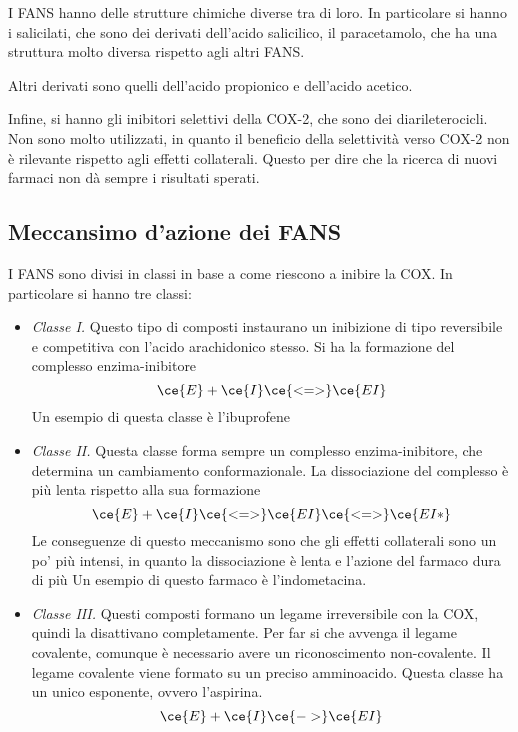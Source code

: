 I FANS hanno delle strutture chimiche diverse tra di loro. In
particolare si hanno i salicilati, che sono dei derivati dell'acido
salicilico, il paracetamolo, che ha una struttura molto diversa rispetto
agli altri FANS.

Altri derivati sono quelli dell'acido propionico e dell'acido acetico.

Infine, si hanno gli inibitori selettivi della COX-2, che sono dei
diarileterocicli. Non sono molto utilizzati, in quanto il beneficio
della selettività verso COX-2 non è rilevante rispetto agli effetti
collaterali. Questo per dire che la ricerca di nuovi farmaci non dà
sempre i risultati sperati.


\subsection{Meccansimo d'azione dei FANS}

I FANS sono divisi in
classi
in base a come riescono a inibire la COX. In particolare si hanno tre
classi:

\begin{itemize}
\item
\emph{Classe I.} Questo tipo di composti instaurano un inibizione di
tipo reversibile e competitiva con l'acido arachidonico stesso. Si ha
la formazione del complesso enzima-inibitore \[
\ce{E} + \ce{I} \ce{<=>} \ce{EI}
\] Un esempio di questa classe è l'ibuprofene
\item
\emph{Classe II.} Questa classe forma sempre un complesso
enzima-inibitore, che determina un cambiamento conformazionale. La
dissociazione del complesso è più lenta rispetto alla sua formazione
\[
\ce{E} + \ce{I} \ce{<=>} \ce{EI} \ce{<=>} \ce{EI*}
\] Le conseguenze di questo meccanismo sono che gli effetti
collaterali sono un po' più intensi, in quanto la dissociazione è
lenta e l'azione del farmaco dura di più Un esempio di questo farmaco
è l'indometacina.
\item
\emph{Classe III.} Questi composti formano un legame irreversibile con
la COX, quindi la disattivano completamente. Per far si che avvenga il
legame covalente, comunque è necessario avere un riconoscimento
non-covalente. Il legame covalente viene formato su un preciso
amminoacido. Questa classe ha un unico esponente, ovvero l'aspirina.
\[
\ce{E} + \ce{I} \ce{->} \ce{EI}
\]
\end{itemize}


